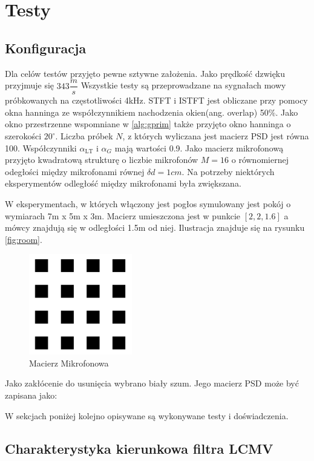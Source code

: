 \chapter{Testy}
\label{chapter-5}
\section{Konfiguracja}
Dla celów testów przyjęto pewne sztywne założenia. Jako prędkość dzwięku przyjmuje się $343 \dfrac{m}{s}$ Wszystkie testy są przeprowadzane na sygnałach mowy próbkowanych na częstotliwości 4kHz. STFT i ISTFT jest obliczane przy pomocy okna hanninga \cite{hann} ze współczynnikiem nachodzenia okien(ang. overlap) 50$\%$. Jako okno przestrzenne wspomniane w \ref{alg:gprim} także przyjęto okno hanninga o szerokości $20^{\circ}$. Liczba próbek $N$, z których wyliczana jest macierz PSD jest równa 100. Współczynniki $\alpha_{\mathrm{LT}}$ i $\alpha_{G}$ mają wartości 0.9. Jako macierz mikrofonową przyjęto kwadratową strukturę o liczbie mikrofonów $M=16$ o równomiernej odegłości między mikrofonami równej $\delta d = 1cm$. Na potrzeby niektórych eksperymentów odległość między mikrofonami była zwiększana.

W eksperymentach, w których włączony jest pogłos symulowany jest pokój o wymiarach 7m x 5m x 3m. Macierz umieszczona jest w punkcie $[2,2,1.6]$ a mówcy znajdują się w odległości 1.5m od niej. Ilustracja znajduje się na rysunku \ref{fig:room}.

\begin{figure}[h!]
    \centering
    \includegraphics[width=0.4\textwidth]{Images/microphone.png}
    \caption{Macierz Mikrofonowa}
    \label{fig:microphone}
\end{figure}

Jako zakłócenie do usunięcia wybrano biały szum. Jego macierz PSD może być zapisana jako:

W sekcjach poniżej kolejno opisywane są wykonywane testy i doświadczenia.

\section{Charakterystyka kierunkowa filtra LCMV}

